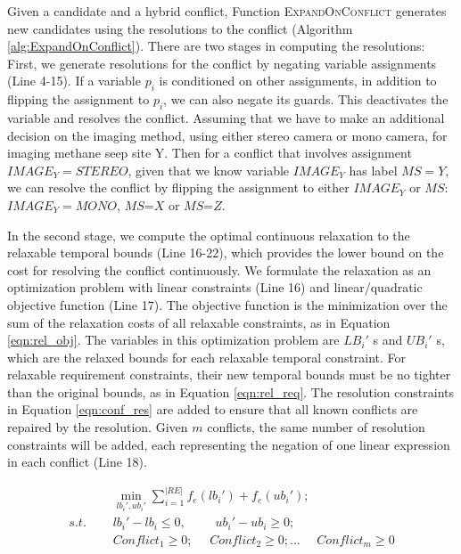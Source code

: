 \documentclass[jair,twoside,11pt,theapa]{article}
\begin{document}
Given a candidate and a hybrid conflict, Function \textsc{ExpandOnConflict} generates
new candidates using the resolutions to the conflict (Algorithm
\ref{alg:ExpandOnConflict}). There are two stages in computing the resolutions:
First, we generate resolutions for the conflict by negating variable assignments
(Line 4-15). If a variable $p_i$ is conditioned on other assignments, in
addition to flipping the assignment to $p_i$, we can also negate its guards. This
deactivates the variable and resolves the conflict. Assuming that we have to make an additional decision on the imaging method, using either stereo camera or mono camera, for imaging methane seep site Y. Then for a conflict that involves assignment $\mathit{IMAGE_Y=STEREO}$, given that we know variable $\mathit{IMAGE_Y}$ has label $MS=Y$, we can resolve the conflict by flipping the assignment to either $\mathit{IMAGE_Y}$ or $MS$: $\mathit{IMAGE_Y=MONO}$, $MS$=$X$ or $MS$=$Z$.


In the second stage, we compute the optimal continuous relaxation to the
relaxable temporal bounds (Line 16-22), which provides the lower bound on the
cost for resolving the conflict continuously. We formulate the relaxation as an optimization
problem with linear constraints (Line 16) and linear/quadratic objective
function (Line 17). The objective function is the minimization over the sum of
the relaxation costs of all relaxable constraints, as in Equation \ref{eqn:rel_obj}.
The variables in this optimization problem are $LB_i'$ s and $UB_i'$ s, which
are the relaxed bounds for each relaxable temporal constraint. For relaxable
requirement constraints, their new temporal bounds must be no tighter than the
original bounds, as in Equation \ref{eqn:rel_req}. The resolution constraints in
Equation \ref{eqn:conf_res} are added to ensure that all known conflicts are repaired
by the resolution. Given $m$ conflicts, the same number of resolution
constraints will be added, each representing the negation of one linear
expression in each conflict (Line 18).

\begin{problem}
	\begin{align}
		&\phantom{=}	\min_{lb_i',ub_i'}\sum\limits_{i=1}^{|RE|}f_{e}(lb_i')+f_{e}(ub_i'); \label{eqn:rel_obj}\\
		s.t. &\phantom{=} lb_i'-lb_i \leq 0, \quad \phantom{=} ub_i'-ub_i \geq 0; \label{eqn:rel_req}\\
		&\phantom{=} Conflict_1 \geq 0; \phantom{=} Conflict_2 \geq 0;  ... \phantom{=} Conflict_m \geq 0 \label{eqn:conf_res}
	\end{align}
	\label{prob:conflict_resolution_consistency}
\end{problem}
\end{document}

